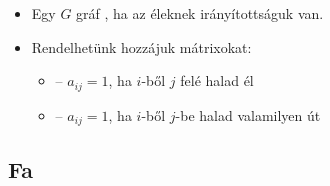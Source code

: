 \documentclass[../../main.tex]{subfiles}
\begin{document}
\begin{itemize}
  \item Egy $G$ gráf , ha az éleknek irányítottságuk van.

  \item Rendelhetünk hozzájuk mátrixokat:
        \begin{itemize}
          \item {} – $a_{ij} = 1$,
                ha $i$-ből $j$ felé halad él

          \item {} – $a_{ij} = 1$,
                ha $i$-ből $j$-be halad valamilyen út
        \end{itemize}
\end{itemize}

\subsection{Fa}
\end{document}
